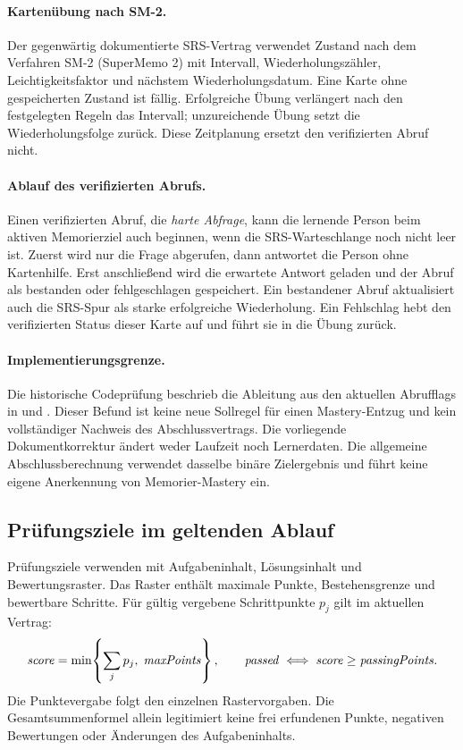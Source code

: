 \paragraph{Kartenübung nach SM-2.}
Der gegenwärtig dokumentierte SRS-Vertrag verwendet Zustand nach dem
Verfahren SM-2 (SuperMemo 2) mit
Intervall, Wiederholungszähler, Leichtigkeitsfaktor und nächstem
Wiederholungsdatum. Eine Karte ohne gespeicherten Zustand ist fällig.
Erfolgreiche Übung verlängert nach den festgelegten Regeln das
Intervall; unzureichende Übung setzt die Wiederholungsfolge zurück.
Diese Zeitplanung ersetzt den verifizierten Abruf nicht.

\paragraph{Ablauf des verifizierten Abrufs.}
Einen verifizierten Abruf, die \emph{harte Abfrage}, kann die lernende
Person beim aktiven Memorierziel
auch beginnen, wenn die SRS-Warteschlange noch nicht leer ist. Zuerst
wird nur die Frage abgerufen, dann antwortet die Person ohne
Kartenhilfe. Erst anschließend wird die erwartete Antwort geladen
und der Abruf als bestanden oder fehlgeschlagen gespeichert.
Ein bestandener Abruf aktualisiert auch die SRS-Spur als starke
erfolgreiche Wiederholung. Ein Fehlschlag hebt den verifizierten
Status dieser Karte auf und führt sie in die Übung zurück.

\paragraph{Implementierungsgrenze.} Die historische Codeprüfung beschrieb die
Ableitung aus den aktuellen Abrufflags in  und
. Dieser Befund ist keine neue Sollregel für einen
Mastery-Entzug und kein vollständiger Nachweis des Abschlussvertrags.
Die vorliegende Dokumentkorrektur ändert weder Laufzeit noch Lernerdaten.
Die allgemeine Abschlussberechnung verwendet dasselbe binäre Zielergebnis
und führt keine eigene Anerkennung von Memorier-Mastery ein.

\subsection{Prüfungsziele im geltenden Ablauf}
\label{sec:exams}

Prüfungsziele verwenden  mit Aufgabeninhalt,
Lösungsinhalt und Bewertungsraster. Das Raster enthält maximale
Punkte, Bestehensgrenze und bewertbare Schritte. Für gültig
vergebene Schrittpunkte $p_j$ gilt im aktuellen Vertrag:
\[
  \mathit{score}=\min\!\left\{\sum_j p_j,\;\mathit{maxPoints}\right\},
  \qquad
  \mathit{passed}\iff \mathit{score}\ge \mathit{passingPoints}.
\]
Die Punktevergabe folgt den einzelnen Rastervorgaben. Die
Gesamtsummenformel allein legitimiert keine frei erfundenen
Punkte, negativen Bewertungen oder Änderungen des Aufgabeninhalts.

